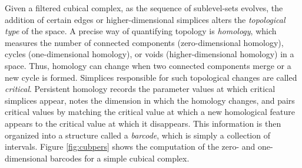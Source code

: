 \documentclass[conference]{IEEEtran}
\theoremstyle{definition}
\numberwithin{figure}{section}
\begin{document}
Given a filtered cubical complex, as the sequence of sublevel-sets evolves, the addition of certain edges or higher-dimensional simplices alters the \emph{topological type} of the space. A precise way of quantifying topology is \emph{homology}, which measures the number of connected components (zero-dimensional homology), cycles (one-dimensional homology), or voids (higher-dimensional homology) in a space. Thus, homology can change when two connected components merge or a new cycle is formed. Simplices responsible for such topological changes are called \emph{critical}. Persistent homology records the parameter values at which critical simplices appear, notes the dimension in which the homology changes, and pairs critical values by matching the critical value at which a new homological feature appears to the critical value at which it disappears. This information is then organized into a structure called a \emph{barcode}, which is simply a collection of intervals. Figure \ref{fig:cubpers} shows the computation of the zero- and one-dimensional barcodes for a simple cubical complex.\\
\end{document}
